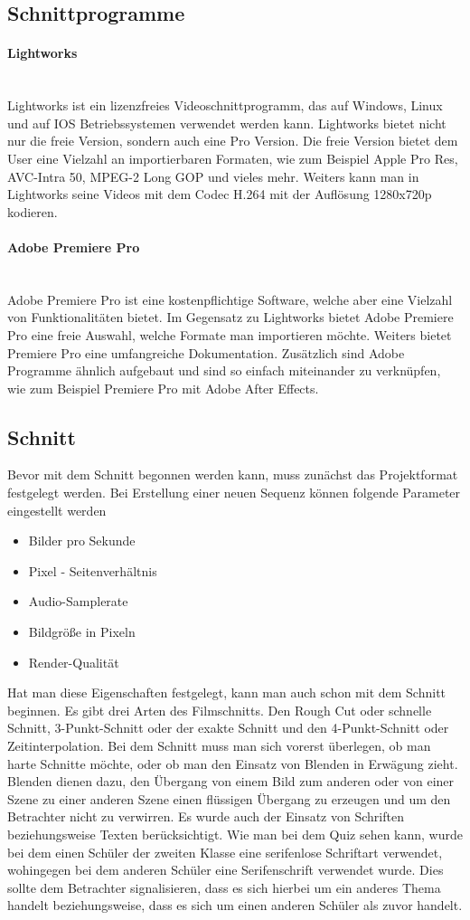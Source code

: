 \subsection{Schnittprogramme}
\paragraph{Lightworks}
\leavevmode \\
Lightworks ist ein lizenzfreies Videoschnittprogramm, das auf Windows, Linux und auf IOS Betriebssystemen verwendet werden kann. Lightworks bietet nicht nur die freie Version, sondern auch eine Pro Version. Die freie Version bietet dem User eine Vielzahl an importierbaren Formaten, wie zum Beispiel Apple Pro Res, AVC-Intra 50, MPEG-2 Long GOP und vieles mehr. Weiters kann man in Lightworks seine Videos mit dem Codec H.264 mit der Auflösung 1280x720p kodieren. 
\paragraph{Adobe Premiere Pro}
\leavevmode \\
Adobe Premiere Pro ist eine kostenpflichtige Software, welche aber eine Vielzahl von Funktionalitäten bietet. Im Gegensatz zu Lightworks bietet Adobe Premiere Pro eine freie Auswahl, welche Formate man importieren möchte. Weiters bietet Premiere Pro eine umfangreiche Dokumentation. Zusätzlich sind Adobe Programme ähnlich aufgebaut und sind so einfach miteinander zu verknüpfen, wie zum Beispiel Premiere Pro mit Adobe After Effects. 
\subsection{Schnitt}
Bevor mit dem Schnitt begonnen werden kann, muss zunächst das Projektformat festgelegt werden. Bei Erstellung einer neuen Sequenz können folgende Parameter eingestellt werden
\begin{itemize}
	\item Bilder pro Sekunde
	\item Pixel - Seitenverhältnis
	\item Audio-Samplerate
	\item Bildgröße in Pixeln
	\item Render-Qualität
\end{itemize}
Hat man diese Eigenschaften festgelegt, kann man auch schon mit dem Schnitt beginnen. Es gibt drei Arten des Filmschnitts. Den Rough Cut oder schnelle Schnitt, 3-Punkt-Schnitt oder der exakte Schnitt und den 4-Punkt-Schnitt oder Zeitinterpolation. Bei dem Schnitt muss man sich vorerst überlegen, ob man harte Schnitte möchte, oder ob man den Einsatz von Blenden in Erwägung zieht. Blenden dienen dazu, den Übergang von einem Bild zum anderen oder von einer Szene zu einer anderen Szene einen flüssigen Übergang zu erzeugen und um den Betrachter nicht zu verwirren.
Es wurde auch der Einsatz von Schriften beziehungsweise Texten berücksichtigt. Wie man bei dem Quiz sehen kann, wurde bei dem einen Schüler der zweiten Klasse eine serifenlose Schriftart verwendet, wohingegen bei dem anderen Schüler eine Serifenschrift verwendet wurde. Dies sollte dem Betrachter signalisieren, dass es sich hierbei um ein anderes Thema handelt beziehungsweise, dass es sich um einen anderen Schüler als zuvor handelt.
